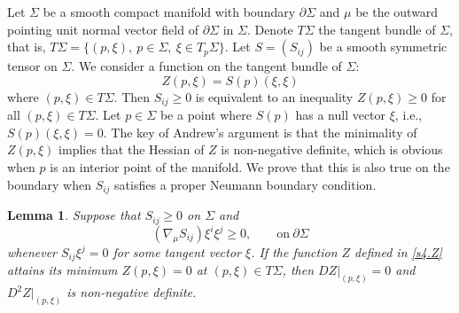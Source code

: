 \documentclass[11pt,reqno]{amsart}
\newtheorem{lem}[thm]{Lemma}
\theoremstyle{definition}
\theoremstyle{remark}
\numberwithin{equation}{section}
\renewcommand{\(}{\left(}
\renewcommand{\)}{\right)}
\renewcommand{\-}{\overline}
\begin{document}
Let $\Sigma$ be a smooth compact manifold with boundary $\partial \Sigma$ and $\mu$ be the outward pointing unit normal vector field of $\partial\Sigma$ in $\Sigma$.
Denote $T\Sigma$ the tangent bundle of $\Sigma$, that is, $T\Sigma=\{(p,\xi),~p\in \Sigma, ~\xi\in T_p\Sigma\}$. Let $S=(S_{ij})$ be a smooth symmetric tensor on $\Sigma$. We consider a function on the tangent bundle of $\Sigma$:
\begin{equation}\label{s4.Z}
Z(p,\xi)=S(p)(\xi,\xi)
\end{equation}
where $(p,\xi)\in T\Sigma$. Then $S_{ij}\geq 0$ is equivalent to an inequality  $Z(p,\xi)\geq 0$ for all $(p,\xi)\in T\Sigma$.  Let $p\in \Sigma$ be a point where $S(p)$ has a null vector $\xi$, i.e., $S(p)(\xi,\xi)=0$.  The key of Andrew's argument \cite[\S 3]{And2007} is that the minimality of $Z(p,\xi)$ implies that the Hessian of $Z$ is non-negative definite, which is obvious when $p$ is an interior point of the manifold. We prove that this is also true on the boundary when $S_{ij}$ satisfies a proper Neumann boundary condition.
\begin{lem}\label{s3:tech-lemma}
Suppose that $S_{ij}\geq 0$ on $\Sigma$ and
\begin{equation}\label{s4.lem1}
  (\nabla_\mu S_{ij})\xi^i\xi^j\geq 0,\qquad\mathrm{ on}~ \partial\Sigma
\end{equation}
whenever $S_{ij}\xi^j=0$ for some tangent vector $\xi$. If the function $Z$ defined in \eqref{s4.Z} attains its minimum $Z(p,\xi)=0$ at $(p,\xi)\in T\Sigma$, then $D Z|_{(p,\xi)}=0$ and $D^2Z|_{(p,\xi)}$ is non-negative definite.
\end{lem}
\end{document}
